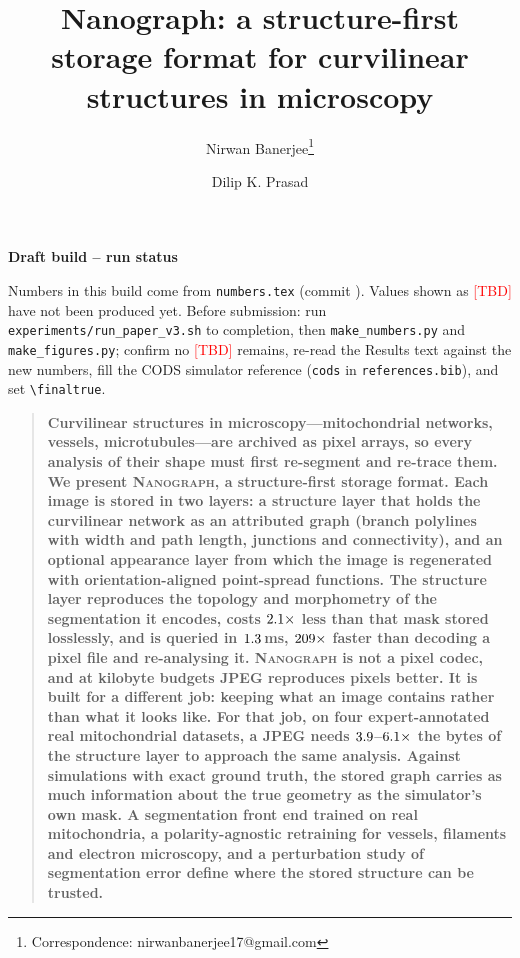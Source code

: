 \documentclass[10pt,a4paper]{article}
\newcommand{\method}{\textnormal{\textsc{Nanograph}}\xspace}
\providecommand{\tbd}{\textcolor{red}{[TBD]}}
\newif\iffinal
\renewenvironment{abstract}
  {\begin{quote}\small\bfseries\noindent}
  {\end{quote}}
\begin{document}
\iffinal\else
\begin{center}\large\bfseries\color{red} Draft build -- run status\end{center}
{\color{red}\small
Numbers in this build come from \texttt{numbers.tex} (commit \RunCommit).
Values shown as \tbd{} have not been produced yet. Before submission:
run \texttt{experiments/run\_paper\_v3.sh} to completion, then
\texttt{make\_numbers.py} and \texttt{make\_figures.py}; confirm no
\tbd{} remains, re-read the Results text against the new numbers, fill the
CODS simulator reference (\texttt{cods} in \texttt{references.bib}), and set
\texttt{\textbackslash finaltrue}.\par}
\clearpage
\fi

\title{Nanograph: a structure-first storage format for curvilinear
structures in microscopy}

\author[1]{Nirwan Banerjee\thanks{Correspondence: nirwanbanerjee17@gmail.com}}
\author[1]{Dilip K. Prasad}
\date{}

\maketitle
\linenumbers

\begin{abstract}
Curvilinear structures in microscopy---mitochondrial networks, vessels,
microtubules---are archived as pixel arrays, so every analysis of their shape
must first re-segment and re-trace them. We present \method, a
structure-first storage format. Each image is stored in two layers: a
structure layer that holds the curvilinear network as an attributed graph
(branch polylines with width and path length, junctions and connectivity),
and an optional appearance layer from which the image is regenerated with
orientation-aligned point-spread functions. The structure layer reproduces
the topology and morphometry of the segmentation it encodes, costs
$2.1\times$ less than that mask stored losslessly, and is queried
in $1.3$\,ms, $209\times$ faster than decoding a pixel
file and re-analysing it. \method is not a pixel codec, and at kilobyte
budgets JPEG reproduces pixels better. It is built for a different job:
keeping what an image contains rather than what it looks like. For that job,
on four expert-annotated real mitochondrial datasets, a JPEG needs
$3.9$--$6.1\times$ the bytes of the structure
layer to approach the same analysis. Against simulations with exact ground truth, the stored graph
carries as much information about the true geometry as the simulator's own
mask. A segmentation front end trained on real mitochondria, a
polarity-agnostic retraining for vessels, filaments and electron microscopy,
and a perturbation study of segmentation error define where the stored
structure can be trusted.
\end{abstract}
\end{document}
